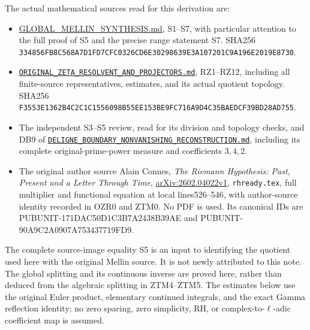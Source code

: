 The actual mathematical sources read for this derivation are:

\begin{itemize}
\tightlist
\item
  \href{https://github.com/KokunoYumeto/zeta-function-research-reader/blob/main/workbenches/splitzero-tandem/continuations/20260924-cohomology-weight-and-character-lifts/gct-weight-control/proofs/GLOBAL_MELLIN_SYNTHESIS.md}{GLOBAL\_MELLIN\_SYNTHESIS.md},
  S1--S7, with particular attention to the full proof of S5 and the
  precise range statement S7. SHA256
  \nolinkurl{334856FB8C568A7D1FD7CFC0326CD6E30298639E3A107201C9A196E2019E8730}.
\item
  \href{https://github.com/KokunoYumeto/zeta-function-research-reader/blob/main/workbenches/splitzero-tandem/continuations/20260924-cohomology-weight-and-character-lifts/gct-weight-control/proofs/ORIGINAL_ZETA_RESOLVENT_AND_PROJECTORS.md}{\nolinkurl{ORIGINAL_ZETA_RESOLVENT_AND_PROJECTORS.md}},
  RZ1--RZ12, including all finite-source representatives, estimates, and
  its actual quotient topology. SHA256
  \nolinkurl{F3553E1362B4C2C1C1556098B55EE153BE9FC716A9D4C35BAEDCF39BD28AD755}.
\item
  The independent S3--S5 review, read for its division and topology
  checks, and DB9 of
  \href{https://github.com/KokunoYumeto/zeta-function-research-reader/blob/main/workbenches/splitzero-tandem/continuations/20260924-cohomology-weight-and-character-lifts/gct-weight-control/proofs/DELIGNE_BOUNDARY_NONVANISHING_RECONSTRUCTION.md}{\nolinkurl{DELIGNE_BOUNDARY_NONVANISHING_RECONSTRUCTION.md}},
  including its complete original-prime-power measure and coefficients
  \(3,4,2\).
\item
  The original author source Alain Connes, \emph{The Riemann Hypothesis:
  Past, Present and a Letter Through Time},
  \href{https://arxiv.org/abs/2602.04022v1}{arXiv:2602.04022v1},
  \texttt{rhready.tex}, full multiplier and functional equation at local
  lines526--546, with author-source identity recorded in OZR0 and ZTM0.
  No PDF is used. Its canonical IDs are PUBUNIT-171DAC50D1C3B7A2438B39AE
  and PUBUNIT-90A9C2A0907A753437719FD9.
\end{itemize}

The complete source-image equality S5 is an input to identifying the
quotient used here with the original Mellin source. It is not newly
attributed to this note. The global splitting and its continuous inverse
are proved here, rather than deduced from the algebraic splitting in
ZTM4--ZTM5. The estimates below use the original Euler product,
elementary continued integrals, and the exact Gamma reflection identity;
no zero spacing, zero simplicity, RH, or complex-to-\(\ell\)-adic
coefficient map is assumed.

